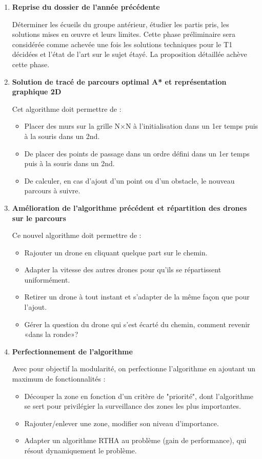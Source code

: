 \documentclass[12pt, openany]{article}
\begin{document}
\begin{enumerate}
\setlength\itemsep{0.7cm}

\item 
\textbf{Reprise du dossier de l'année précédente}

Déterminer les écueils du groupe antérieur, étudier les partis pris, les solutions mises en œuvre et leurs limites. Cette phase préliminaire sera considérée comme achevée une fois les solutions techniques pour le T1 décidées et l'état de l'art sur le sujet étayé. La proposition détaillée achève cette phase.

\item
\textbf{Solution de tracé de parcours optimal A* et représentation graphique 2D}

Cet algorithme doit permettre de :
\begin{itemize}
    \setlength\itemsep{0.1cm}
    \item Placer des murs sur la grille N×N à l’initialisation dans un 1er temps puis à la souris dans un 2nd.
    \item De placer des points de passage dans un ordre défini dans un 1er temps puis à la souris dans un 2nd.
    \item De calculer, en cas d’ajout d’un point ou d’un obstacle, le nouveau parcours à suivre.
\end{itemize}

\item
\textbf{Amélioration de l'algorithme précédent et répartition des drones sur le parcours}

Ce nouvel algorithme doit permettre de :
\begin{itemize}
    \setlength\itemsep{0.1cm}
    \item Rajouter un drone en cliquant quelque part sur le chemin.
    \item Adapter la vitesse des autres drones pour qu’ils se répartissent uniformément.
    \item Retirer un drone à tout instant et s’adapter de la même façon que pour l’ajout.
    \item Gérer la question du drone qui s’est écarté du chemin, comment revenir «dans la ronde»?
\end{itemize}
	

\item
\textbf{Perfectionnement de l'algorithme}

Avec pour objectif la modularité, on perfectionne l'algorithme en ajoutant un maximum de fonctionnalités :
\begin{itemize}
    \setlength\itemsep{0.1cm}
    \item Découper la zone en fonction d'un critère de "priorité", dont l'algorithme se sert pour privilégier la surveillance des zones les plus importantes.
    \item Rajouter/enlever une zone, modifier son niveau d’importance.
    \item Adapter un algorithme RTHA au problème (gain de performance), qui résout dynamiquement le problème.
\end{itemize}


\end{enumerate}
\end{document}
